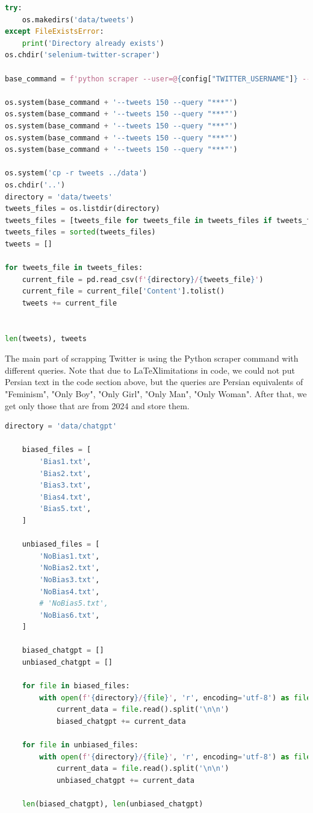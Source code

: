 \documentclass{solutionclass} %
\begin{document}
\begin{lstlisting}[language=Python]
try:
	os.makedirs('data/tweets')
except FileExistsError:
	print('Directory already exists')
os.chdir('selenium-twitter-scraper')

base_command = f'python scraper --user=@{config["TWITTER_USERNAME"]} --password={config["TWITTER_PASSWORD"]} --top '

os.system(base_command + '--tweets 150 --query "***"')
os.system(base_command + '--tweets 150 --query "***"')
os.system(base_command + '--tweets 150 --query "***"')
os.system(base_command + '--tweets 150 --query "***"')
os.system(base_command + '--tweets 150 --query "***"')

os.system('cp -r tweets ../data')
os.chdir('..')
directory = 'data/tweets'
tweets_files = os.listdir(directory)
tweets_files = [tweets_file for tweets_file in tweets_files if tweets_file.startswith('2024')]
tweets_files = sorted(tweets_files)
tweets = []

for tweets_file in tweets_files:
    current_file = pd.read_csv(f'{directory}/{tweets_file}')
    current_file = current_file['Content'].tolist()
    tweets += current_file


len(tweets), tweets
\end{lstlisting}

\begin{solution}
The main part of scrapping Twitter is using the Python scraper command with different queries. Note that due to \LaTeX limitations in code, we could not put Persian text in the code section above, but the queries are Persian equivalents of "Feminism", "Only Boy", "Only Girl", "Only Man", "Only Woman". After that, we get only those that are from 2024 and store them.
\end{solution}



\begin{lstlisting}[language=Python]
	directory = 'data/chatgpt'
	
	biased_files = [
		'Bias1.txt',
		'Bias2.txt',
		'Bias3.txt',
		'Bias4.txt',
		'Bias5.txt',
	]
	
	unbiased_files = [
		'NoBias1.txt',
		'NoBias2.txt',
		'NoBias3.txt',
		'NoBias4.txt',
		# 'NoBias5.txt',
		'NoBias6.txt',
	]
	
	biased_chatgpt = []
	unbiased_chatgpt = []
	
	for file in biased_files:
		with open(f'{directory}/{file}', 'r', encoding='utf-8') as file:
			current_data = file.read().split('\n\n')
			biased_chatgpt += current_data
	
	for file in unbiased_files:
		with open(f'{directory}/{file}', 'r', encoding='utf-8') as file:
			current_data = file.read().split('\n\n')
			unbiased_chatgpt += current_data
	
	len(biased_chatgpt), len(unbiased_chatgpt)
	\end{lstlisting}
	
\end{document}
